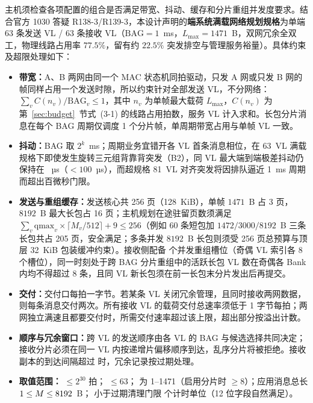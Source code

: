 主机须检查各项配置的组合是否满足带宽、抖动、缓存和分片重组并发度要求。结合官方 1030 答疑 R138-3/R139-3，本设计声明的\textbf{端系统满载网络规划规格}为单端 63 条发送 VL / 63 条接收 VL（$\text{BAG}=1$~ms，$L_\text{max}=1471$~B，双网冗余全双工，物理线路占用率 $77.5\%$，留有约 $22.5\%$ 突发排空与管理服务裕量）。具体约束及超限处理如下：
\begin{itemize}
  \item \textbf{带宽：}A、B 两网由同一个 MAC 状态机同拍驱动，只发 A 网或只发 B 网的帧同样占用一个发送时隙，所以约束针对全部发送 VL，不分网络：$\sum_v C(n_v)/\text{BAG}_v \le 1$，其中 $n_v$ 为单帧最大载荷 $L_\text{max}$，$C(n_v)$ 为第~\ref{sec:budget}~节式~(3-1) 的线路占用拍数，服务 VL 计入求和。长包分片消息在每个 BAG 周期仅调度 1 个分片帧，单周期带宽占用与单帧 VL 一致。
  \item \textbf{抖动：}BAG 取 $2^k$~ms；周期业务宜错开各 VL 首条消息相位，在 63~VL 满载规格下即使发生旋转三元组背靠背突发（B2），同 VL 最大端到端极差抖动仍保持在 \JitSixtyThreeBTwo~µs（$<100$~µs），而超规格 81~VL 对齐突发将因排队逼近 1~ms 周期而超出百微秒门限。
  \item \textbf{发送与重组缓存：}发送核心共 256 页（128~KiB），单帧 $1471$~B 占 3 页，$8192$~B 最大长包占 16 页；主机规划在途驻留页数须满足 $\sum_v \text{qmax}_v \times \lceil M_v / 512 \rceil + 9 \le 256$（例如 60 条短包加 $1472/3000/8192$~B 三条长包共占 205 页，安全满足；多条并发 $8192$~B 长包则须受 256 页总预算与顶层 32~KiB 包装缓冲约束）。接收侧配备 \ReasmContexts{} 个并发重组槽位（奇偶 VL 索引各 8 个槽位），同一时刻处于跨 BAG 分片重组中的活跃长包 VL 数在奇偶各 Bank 内均不得超过 8 条，且同 VL 新长包须在前一长包末分片发出后再提交。
  \item \textbf{交付：}交付口每拍一字节。若某条 VL 关闭冗余管理，且同时接收两网数据，则每条消息交付两次。所有接收 VL 的载荷交付总速率须低于 1 字节每拍；两网独立满速且都要交付时，所需交付速率超过该上限，超出部分按溢出计数。
  \item \textbf{顺序与冗余窗口：}跨 VL 的发送顺序由各 VL 的 BAG 与候选选择共同决定；接收分片必须在同一 VL 内按递增片偏移顺序到达，乱序分片将被拒绝。接收副本的到达间隔超过  时，冗余记录按过期处理。
  \item \textbf{取值范围：} $\le 2^{30}$ 拍； $\le 63$； 为 1--1471（启用分片时 $\ge 8$）；应用消息总长 $1\le M\le 8192$~B； 小于过期清理门限  个计时单位（12 位字段自然满足）。
\end{itemize}

